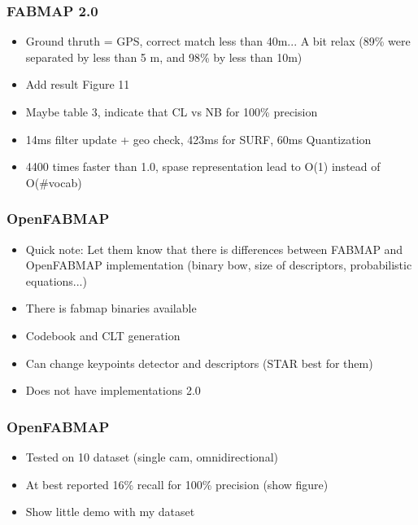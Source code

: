 \begin{frame}
    \frametitle{FABMAP 2.0}
    \begin{itemize}
        \item Ground thruth = GPS, correct match less than 40m... A bit relax (89\% were separated by less than 5 m, and 98\% by less than 10m)
        \item Add result Figure 11
        \item Maybe table 3, indicate that CL vs NB for 100\% precision
        \item 14ms filter update + geo check, 423ms for SURF, 60ms Quantization
        \item 4400 times faster than 1.0, spase representation lead to O(1) instead of O(\#vocab)
    \end{itemize}
\end{frame}

\begin{frame}
    \frametitle{OpenFABMAP}
    \begin{itemize}
        \item Quick note: Let them know that there is differences between FABMAP and OpenFABMAP implementation (binary bow, size of descriptors, probabilistic equations...)
        \item There is fabmap binaries available
        \item Codebook and CLT generation
        \item Can change keypoints detector and descriptors (STAR best for them)
        \item Does not have implementations 2.0
    \end{itemize}
\end{frame}

\begin{frame}
    \frametitle{OpenFABMAP}
    \begin{itemize}
        \item Tested on 10 dataset (single cam, omnidirectional)
        \item At best reported 16\% recall for 100\% precision (show figure)
        \item Show little demo with my dataset
    \end{itemize}
\end{frame}
